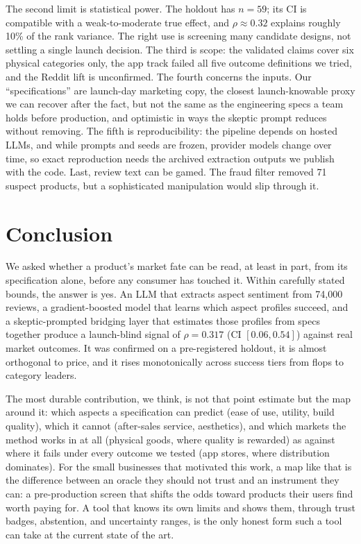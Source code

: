 \documentclass[journal]{IEEEtran}
\begin{document}
The second limit is statistical power. The holdout has $n = 59$; its CI is compatible with a weak-to-moderate true effect, and $\rho \approx 0.32$ explains roughly 10\% of the rank variance. The right use is screening many candidate designs, not settling a single launch decision. The third is scope: the validated claims cover six physical categories only, the app track failed all five outcome definitions we tried, and the Reddit lift is unconfirmed. The fourth concerns the inputs. Our ``specifications'' are launch-day marketing copy, the closest launch-knowable proxy we can recover after the fact, but not the same as the engineering specs a team holds before production, and optimistic in ways the skeptic prompt reduces without removing. The fifth is reproducibility: the pipeline depends on hosted LLMs, and while prompts and seeds are frozen, provider models change over time, so exact reproduction needs the archived extraction outputs we publish with the code. Last, review text can be gamed. The fraud filter removed 71 suspect products, but a sophisticated manipulation \cite{mayzlin2014promotional} would slip through it.

\section{Conclusion}
We asked whether a product's market fate can be read, at least in part, from its specification alone, before any consumer has touched it. Within carefully stated bounds, the answer is yes. An LLM that extracts aspect sentiment from 74{,}000 reviews, a gradient-boosted model that learns which aspect profiles succeed, and a skeptic-prompted bridging layer that estimates those profiles from specs together produce a launch-blind signal of $\rho = 0.317$ (CI $[0.06, 0.54]$) against real market outcomes. It was confirmed on a pre-registered holdout, it is almost orthogonal to price, and it rises monotonically across success tiers from flops to category leaders.

The most durable contribution, we think, is not that point estimate but the map around it: which aspects a specification can predict (ease of use, utility, build quality), which it cannot (after-sales service, aesthetics), and which markets the method works in at all (physical goods, where quality is rewarded) as against where it fails under every outcome we tested (app stores, where distribution dominates). For the small businesses that motivated this work, a map like that is the difference between an oracle they should not trust and an instrument they can: a pre-production screen that shifts the odds toward products their users find worth paying for. A tool that knows its own limits and shows them, through trust badges, abstention, and uncertainty ranges, is the only honest form such a tool can take at the current state of the art.



\end{document}
